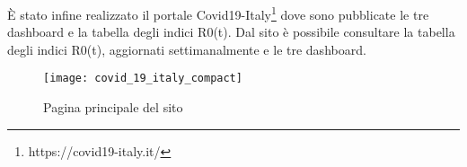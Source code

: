 
\noindent È stato infine realizzato il portale Covid19-Italy\footnote{https://covid19-italy.it/} dove sono pubblicate le tre dashboard e la tabella degli indici R0(t).
\noindent Dal sito è possibile consultare la tabella degli indici R0(t), aggiornati settimanalmente e le tre dashboard.
\begin{figure}[htp]
    \centering
    \texttt{[image: covid\_19\_italy\_compact]}
    \caption{Pagina principale del sito}
    \label{fig:home_page}
\end{figure}

